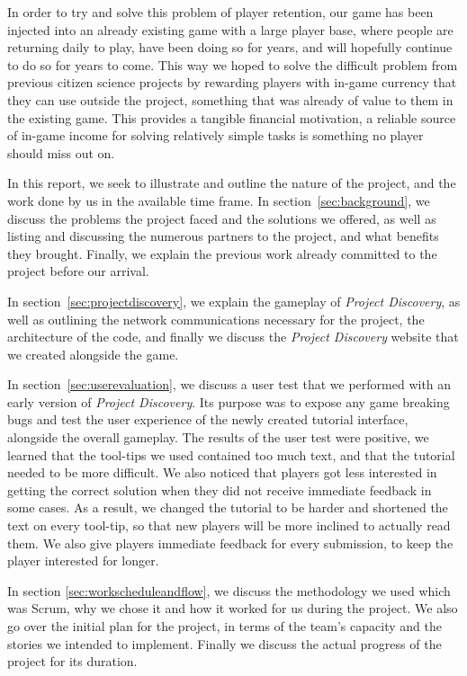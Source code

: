 In order to try and solve this problem of player retention, our game has been injected into an already existing game with a large player base, where people are returning daily to play, have been doing so for years, and will hopefully continue to do so for years to come. This way we hoped to solve the difficult problem from previous citizen science projects by rewarding players with in-game currency that they can use outside the project, something that was already of value to them in the existing game. This provides a tangible financial motivation, a reliable source of in-game income for solving relatively simple tasks is something no player should miss out on.

In this report, we seek to illustrate and outline the nature of the project, and the work done by us in the available time frame. In section~\ref{sec:background}, we discuss the problems the project faced and the solutions we offered, as well as listing and discussing the numerous partners to the project, and what benefits they brought. Finally, we explain the previous work already committed to the project before our arrival.

In section~\ref{sec:projectdiscovery}, we explain the gameplay of \emph{Project Discovery}, as well as outlining the network communications necessary for the project, the architecture of the code, and finally we discuss the \emph{Project Discovery} website that we created alongside the game. 

In section~\ref{sec:userevaluation}, we discuss a user test that we performed with an early version of \emph{Project Discovery}. Its purpose was to expose any game breaking bugs and test the user experience of the newly created tutorial interface, alongside the overall gameplay. The results of the user test were positive, we learned that the tool-tips we used contained too much text, and that the tutorial needed to be more difficult. We also noticed that players got less interested in getting the correct solution when they did not receive immediate feedback in some cases. As a result, we changed the tutorial to be harder and shortened the text on every tool-tip, so that new players will be more inclined to actually read them. We also give players immediate feedback for every submission, to keep the player interested for longer.

In section \ref{sec:workscheduleandflow}, we discuss the methodology we used which was Scrum, why we chose it and how it worked for us during the project. We also go over the initial plan for the project, in terms of the team's capacity and the stories we intended to implement. Finally we discuss the actual progress of the project for its duration.

